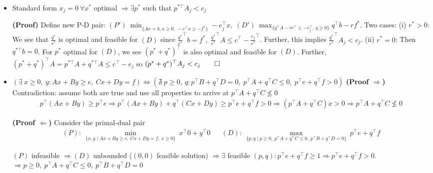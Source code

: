 \documentclass{article}
\begin{document}
\begin{itemize}
    \textbf{(Proof $\Rightarrow$ using Strong duality)} Note $Ax < 0 \iff Ax \leq -\mathbf{1}$. Now consider primal-dual pair $(P): \max_{\{x\mid Ax \leq -\mathbf{1}\}}\mathbf{0}^\top x,\; (D): \min_{\{u\mid u\geq 0, u^\top A = 0\}} -\mathbf{1}^\top u$. $(P)$ feasible $\Longrightarrow (D)$ feasible $\Longrightarrow  -\mathbf{1}^\top u=0$ by strong duality $\Longrightarrow S = \emptyset$ since requires $\mathbf{1}^\top u = 1$

    \item Standard form $x_j = 0\ \forall x^*$ optimal $\Rightarrow \exists p^*$ such that $p^{*\top} A_j < c_j$
    
    \textbf{(Proof)} Define new P-D pair: $(P')\ \min_{\{Ax=b, x\geq0,\ -c^\top x \geq -f^*\}}-e_j^\top x,\; (D')\ \max_{\{q^\top A -rc^\top \leq -e_j^\top,\ q\geq0\}}q^\top b -rf^*$. Two cases: (i) $r^*> 0$: We see that $\tfrac{q^*}{r^*}$ is optimal and feasible for $(D)$ since $\tfrac{q^*}{r^*}^\top b = f^*,\;\tfrac{q^*}{r^*}^\top A \leq c^\top - \tfrac{e_j}{r^*}^\top$. Further, this implies $\tfrac{q^*}{r^*}^\top A_j < c_j$. (ii) $r^*=0$: Then $q^{*\top}b = 0$. For $p^*$ optimal for $(D)$, we see $(p^{*} + q^*)^\top$ is also optimal and feasible for $(D)$. Further, $(p^{*} + q^*)^\top A = p^{*\top}A + q^{*\top}A \leq c^\top - e_j$ so $(p^* + q^*)^\top A_j < c_j \qed$

    \item $(\exists\ x\geq 0,\ y: Ax + By \geq e,\ Cx + Dy = f) \iff (\nexists\ p\geq0,\ q: p^\top B + q^\top D = 0,\ p^\top A + q^\top C \leq 0,\ p^\top e + q^\top f > 0)$
    \textbf{(Proof $\Rightarrow$)} Contradiction: assume both are true and use all properties to arrive at $p^\top A + q^\top C \not\leq 0$
    {\footnotesize
    \begin{align*}
        p^\top (Ax + By) \geq p^\top e \Longrightarrow p^\top (Ax + By) + q^\top (Cx + Dy) \geq p^\top e + q^\top f > 0 \Longrightarrow (p^\top A + q^\top C)x > 0 \Longrightarrow p^\top A + q^\top C \not\leq 0
    \end{align*}
    }

    \textbf{(Proof $\Leftarrow$)}
    Consider the primal-dual pair
    {\footnotesize
    \begin{align*}
        (P):\ \min_{\{x,y\mid Ax + By \geq e,\ Cx + Dy = f,\ x\geq 0\}}\ x^\top 0 + y^\top 0  && 
        (D):\ \max_{\{p,q\mid p\geq 0,\ p^\top A + q^\top C \leq 0,\ p^\top B + q^\top D = 0\}}\ p^\top e + q^\top f
    \end{align*}
    }

    $(P)$ infeasible $\Longrightarrow (D)$ unbounded ($(0,0)$ feasible solution)
    $\Longrightarrow \exists$ feasible $(p,q): p^\top e + q^\top f \geq 1 \Longrightarrow p^\top e + q^\top f > 0$. 
    $\Longrightarrow p\geq 0,\ p^\top A + q^\top C \leq 0,\ p^\top B + q^\top D = 0$

\end{itemize} 
\end{document}
